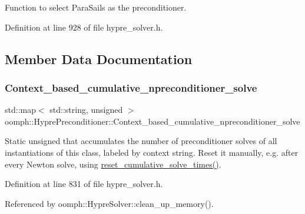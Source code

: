 Function to select Para\+Sails as the preconditioner. 



Definition at line 928 of file hypre\+\_\+solver.\+h.



\subsection{Member Data Documentation}
\mbox{\label{classoomph_1_1HyprePreconditioner_a1eedf6ffc280c11da2e5da705dc5a612}} 
\subsubsection{\texorpdfstring{Context\+\_\+based\+\_\+cumulative\+\_\+npreconditioner\+\_\+solve}{Context\_based\_cumulative\_npreconditioner\_solve}}
{\footnotesize\ttfamily std\+::map$<$ std\+::string, unsigned $>$ oomph\+::\+Hypre\+Preconditioner\+::\+Context\+\_\+based\+\_\+cumulative\+\_\+npreconditioner\+\_\+solve\hspace{0.3cm}{\ttfamily [static]}}



Static unsigned that accumulates the number of preconditioner solves of all instantiations of this class, labeled by context string. Reset it manually, e.\+g. after every Newton solve, using \hyperlink{classoomph_1_1HyprePreconditioner_a126763a53b2c687bc1b150d0fc64fbb6}{reset\+\_\+cumulative\+\_\+solve\+\_\+times()}. 



Definition at line 831 of file hypre\+\_\+solver.\+h.



Referenced by oomph\+::\+Hypre\+Solver\+::clean\+\_\+up\+\_\+memory().

\mbox{\label{classoomph_1_1HyprePreconditioner_a67a4607506c6fa1429f3e87ca04e42a5}} 
